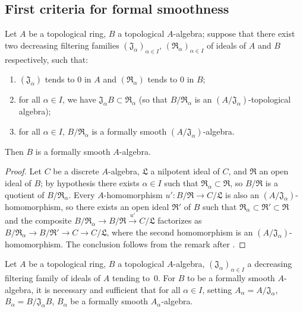 \subsection{First criteria for formal smoothness}
\label{subsection:0.19.4}

\begin{proposition}[19.4.1]
\label{0.19.4.1}
Let $A$ be a topological ring, $B$ a topological $A$-algebra;
suppose that there exist two decreasing filtering families $(\mathfrak{J}_\alpha)_{\alpha\in I}$, $(\mathfrak{R}_\alpha)_{\alpha\in I}$ of ideals of $A$ and $B$ respectively, such that:
\begin{enumerate}
  \item[$1^\circ$] $(\mathfrak{J}_\alpha)$ tends to $0$ in $A$ and $(\mathfrak{R}_\alpha)$ tends to $0$ in $B$;
  \item[$2^\circ$] for all $\alpha\in I$, we have $\mathfrak{J}_\alpha B\subset\mathfrak{R}_\alpha$ (so that $B/\mathfrak{R}_\alpha$ is an $(A/\mathfrak{J}_\alpha)$-topological algebra);
  \item[$3^\circ$] for all $\alpha\in I$, $B/\mathfrak{R}_\alpha$ is a formally smooth $(A/\mathfrak{J}_\alpha)$-algebra.
\end{enumerate}
Then $B$ is a formally smooth $A$-algebra.
\end{proposition}

\begin{proof}
Let $C$ be a discrete $A$-algebra, $\mathfrak{L}$ a nilpotent ideal of $C$, and $\mathfrak{R}$ an open ideal of $B$;
by hypothesis there exists $\alpha\in I$ such that $\mathfrak{R}_\alpha\subset\mathfrak{R}$, so $B/\mathfrak{R}$ is a quotient of $B/\mathfrak{R}_\alpha$.
Every $A$-homomorphism $u':B/\mathfrak{R}\to C/\mathfrak{L}$ is also an
$(A/\mathfrak{J}_\alpha)$-homomorphism, so there exists an open ideal
$\mathfrak{R}'$ of $B$ such that
$\mathfrak{R}_\alpha\subset\mathfrak{R}'\subset\mathfrak{R}$ and the composite
$B/\mathfrak{R}_\alpha\to B/\mathfrak{R}\xrightarrow{u'}C/\mathfrak{L}$
factorizes as
$B/\mathfrak{R}_\alpha\to B/\mathfrak{R}'\to C\to C/\mathfrak{L}$, where the
second homomorphism is an $(A/\mathfrak{J}_\alpha)$-homomorphism. The conclusion
follows from the remark after .
\end{proof}

\begin{corollary}[19.4.2]
\label{0.19.4.2}
Let $A$ be a topological ring, $B$ a topological $A$-algebra, $(\mathfrak{J}_\alpha)_{\alpha\in I}$ a decreasing filtering family of ideals of $A$ tending to~$0$.
For $B$ to be a formally smooth $A$-algebra, it is necessary and sufficient that for all $\alpha\in I$, setting $A_\alpha=A/\mathfrak{J}_\alpha$, $B_\alpha=B/\mathfrak{J}_\alpha B$, $B_\alpha$ be a formally smooth $A_\alpha$-algebra.
\end{corollary}

